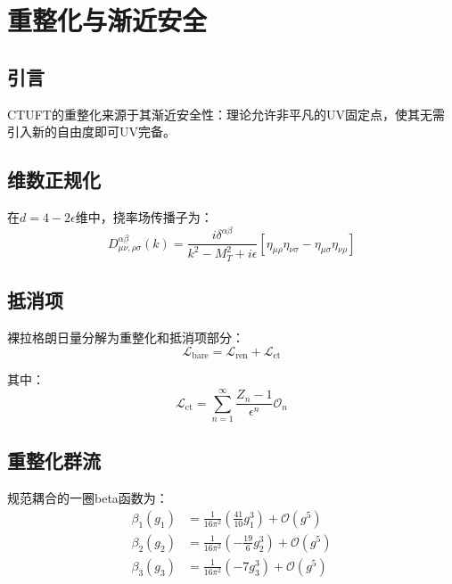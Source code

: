 \section{重整化与渐近安全}
\label{sec:renormalization}

\subsection{引言}

CTUFT的重整化来源于其渐近安全性：理论允许非平凡的UV固定点，使其无需引入新的自由度即可UV完备。

\subsection{维数正规化}

在$d = 4 - 2\epsilon$维中，挠率场传播子为：
\begin{equation}
    D_{\mu\nu,\rho\sigma}^{\alpha\beta}(k) = \frac{i\delta^{\alpha\beta}}{k^2 - M_T^2 + i\epsilon} \left[\eta_{\mu\rho}\eta_{\nu\sigma} - \eta_{\mu\sigma}\eta_{\nu\rho}\right]
\end{equation}

\subsection{抵消项}

裸拉格朗日量分解为重整化和抵消项部分：
\begin{equation}
    \mathcal{L}_{\text{bare}} = \mathcal{L}_{\text{ren}} + \mathcal{L}_{\text{ct}}
\end{equation}

其中：
\begin{equation}
    \mathcal{L}_{\text{ct}} = \sum_{n=1}^\infty \frac{Z_n - 1}{\epsilon^n} \mathcal{O}_n
\end{equation}

\subsection{重整化群流}

\begin{theorem}[beta函数]
规范耦合的一圈beta函数为：
\begin{align}
    \beta_1(g_1) &= \frac{1}{16\pi^2} \left( \frac{41}{10} g_1^3 \right) + \mathcal{O}(g^5) \\
    \beta_2(g_2) &= \frac{1}{16\pi^2} \left( -\frac{19}{6} g_2^3 \right) + \mathcal{O}(g^5) \\
    \beta_3(g_3) &= \frac{1}{16\pi^2} \left( -7 g_3^3 \right) + \mathcal{O}(g^5)
\end{align}
\end{theorem}

